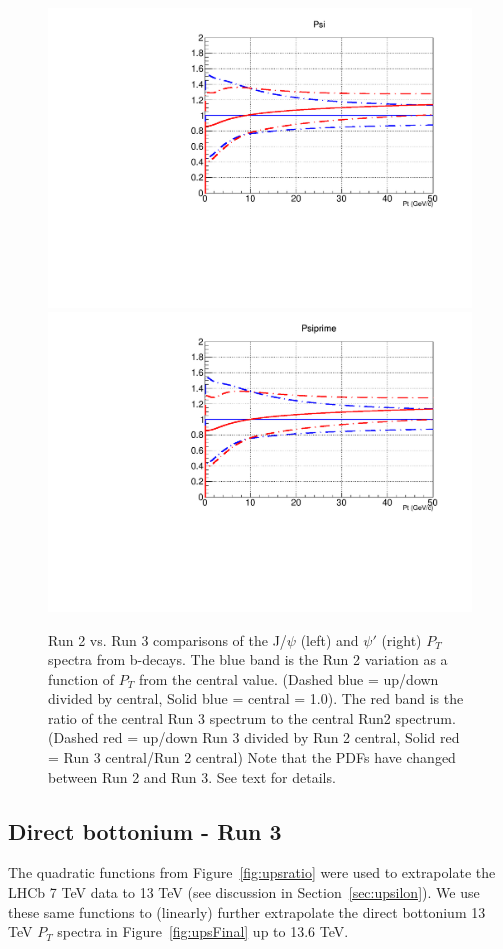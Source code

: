 \documentclass[12pt]{article}
\begin{document}
   \begin{figure}[H]
  \begin{center}
    \includegraphics[width=0.49\linewidth]{../oniaFromB/psi_fromB_Run2_Run3_comparison.pdf}
    \includegraphics[width=0.49\linewidth]{../oniaFromB/psiprime_fromB_Run2_Run3_comparison.pdf}   
    \caption{\protect Run 2 vs. Run 3 comparisons of the J/$\psi$ (left) and 
      $\psi'$ (right) $P_T$ spectra 
      from b-decays.  The blue band is the Run 2 variation as a function of $P_T$ from the central value. 
(Dashed blue = up/down divided by central, Solid blue = central = 1.0). 
The red band is the ratio of the central Run 3 spectrum to the central Run2 spectrum. 
(Dashed red = up/down Run 3 divided by Run 2 central, Solid red = Run 3 central/Run 2 central) 
Note that the PDFs have changed between Run 2 and Run 3.  See text for details.}
\label{fig:psi_run_comparison}
\end{center}
\end{figure}

\subsection{Direct bottonium - Run 3}
\label{sec:upsilon3}
The quadratic functions from Figure~\ref{fig:upsratio} were used to extrapolate
the LHCb 7 TeV data to 13 TeV (see discussion in Section~\ref{sec:upsilon}).
We use these same functions to (linearly) further extrapolate 
the direct bottonium 13 TeV $P_T$ spectra in Figure~\ref{fig:upsFinal} up to 13.6 TeV. \\
\end{document}
